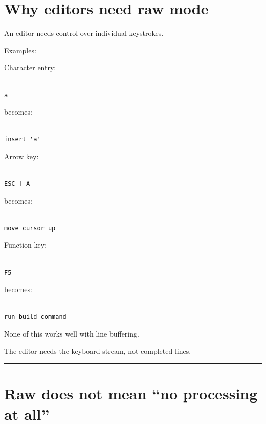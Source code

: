 \documentclass[
  oneside,
  openany]{book}
\begin{document}
\hypertarget{why-editors-need-raw-mode}{%
\section{Why editors need raw mode}\label{why-editors-need-raw-mode}}

An editor needs control over individual keystrokes.

Examples:

Character entry:

\begin{verbatim}

a
\end{verbatim}

becomes:

\begin{verbatim}

insert 'a'
\end{verbatim}

Arrow key:

\begin{verbatim}

ESC [ A
\end{verbatim}

becomes:

\begin{verbatim}

move cursor up
\end{verbatim}

Function key:

\begin{verbatim}

F5
\end{verbatim}

becomes:

\begin{verbatim}

run build command
\end{verbatim}

None of this works well with line buffering.

The editor needs the keyboard stream, not completed lines.

\begin{center}\rule{0.5\linewidth}{0.5pt}\end{center}

\hypertarget{raw-does-not-mean-no-processing-at-all}{%
\section{Raw does not mean ``no processing at
all''}\label{raw-does-not-mean-no-processing-at-all}}
\end{document}
